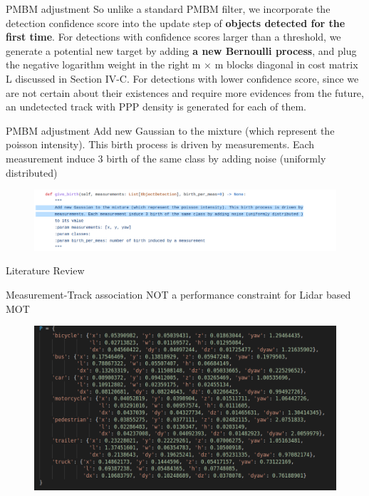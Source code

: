    \begin{frame}{PMBM adjustment}
        So unlike a standard PMBM filter, we incorporate the detection confidence score into the update step 
        of \textbf{objects detected for the first time}. 
        For detections with confidence scores larger than a threshold, 
        we generate a potential new target by adding \textbf{a new Bernoulli process}, 
        and plug the negative logarithm weight in the right m × m blocks diagonal in cost matrix L 
        discussed in Section IV-C. For detections with lower confidence score, 
        since we are not certain about their existences and require more evidences from the future, 
        an undetected track with PPP density is generated for each of them.
        \href{https://www.researchgate.net/publication/355428771_3D_Multi-Object_Tracking_using_Random_Finite_Set-based_Multiple_Measurement_Models_Filtering_RFS-M_3_for_Autonomous_Vehicles}{}
        
    \end{frame}
    
    \begin{frame}{PMBM adjustment}
        Add new Gaussian to the mixture (which represent the poisson intensity). This birth process is driven by
        measurements. Each measurement induce 3 birth of the same class by adding noise (uniformly distributed)
        \href{https://github.com/quan-dao/pmbm-filter/blob/5cdf8b31665f1a7008afa963c1ab7c3b048b5856/poisson.py}{}
    
        \begin{figure}
            \includegraphics[width=0.9\linewidth]{pmbm/1.png}
        \end{figure}
    \end{frame}
    

\begin{frame}{Literature Review}
    \begin{block}{Measurement-Track association NOT a performance constraint for Lidar based MOT}
        \begin{figure}
        \includegraphics[width=0.9\linewidth]{DA/2.png}
        \end{figure}
    \end{block}
    \end{frame}
    
